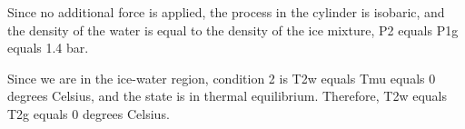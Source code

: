 Since no additional force is applied, the process in the cylinder is isobaric, and the density of the water is equal to the density of the ice mixture, P2 equals P1g equals 1.4 bar.

Since we are in the ice-water region, condition 2 is T2w equals Tmu equals 0 degrees Celsius, and the state is in thermal equilibrium. Therefore, T2w equals T2g equals 0 degrees Celsius.